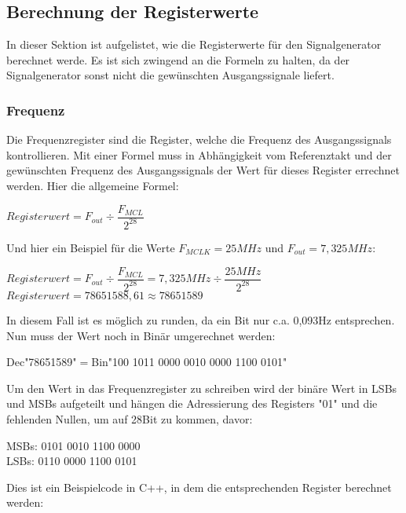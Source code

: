 \subsection{Berechnung der Registerwerte}
In dieser Sektion ist aufgelistet, wie die Registerwerte für den Signalgenerator berechnet werde. Es ist sich zwingend an die Formeln zu halten, da der Signalgenerator sonst nicht die gewünschten Ausgangssignale liefert.
\subsubsection{Frequenz}
Die Frequenzregister sind die Register, welche die Frequenz des Ausgangssignals kontrollieren. Mit einer Formel muss in Abhängigkeit vom Referenztakt und der gewünschten Frequenz des Ausgangssignals der Wert für dieses Register errechnet werden. Hier die allgemeine Formel:\\

\begin{center}
$Registerwert=F_{out}\div \dfrac{F_{MCL}}{2^{28}}$\\
\end{center}
Und hier ein Beispiel für die Werte $F_{MCLK}=25MHz$ und $F_{out}= 7,325MHz$:\\
\begin{center}
$Registerwert=F_{out}\div \dfrac{F_{MCL}}{2^{28}}=7,325MHz\div \dfrac{25MHz}{2^{28}}$\\
\medskip
$Registerwert=78651588,61 \approx 78651589$\\
\end{center}
In diesem Fall ist es möglich zu runden, da ein Bit nur c.a. 0,093Hz entsprechen. Nun muss der Wert noch in Binär umgerechnet werden:\\
\begin{center}
Dec"78651589"$ = $Bin"100 1011 0000 0010 0000 1100 0101"\\
\end{center}
Um den Wert in das Frequenzregister zu schreiben wird der binäre Wert in LSBs und MSBs aufgeteilt und hängen die Adressierung des Registers "01" und die fehlenden Nullen, um auf 28Bit zu kommen, davor:
\begin{center}
MSBs: 0101 0010 1100 0000\\
LSBs: 0110 0000 1100 0101\\
\end{center}
\pagebreak
Dies ist ein Beispielcode in C++, in dem die entsprechenden Register berechnet werden:
\lstset{style=C}


